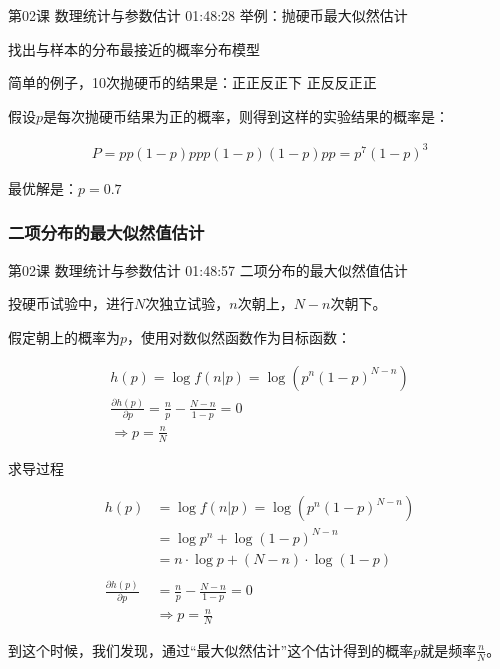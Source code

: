 \documentclass[UTF8]{ctexbook}
\begin{document}
第02课 数理统计与参数估计 01:48:28 举例：抛硬币最大似然估计

找出与样本的分布最接近的概率分布模型

简单的例子，10次抛硬币的结果是：正正反正下 正反反正正

假设$p$是每次抛硬币结果为正的概率，则得到这样的实验结果的概率是：

\begin{equation}
\begin{aligned}
P=pp(1-p)ppp(1-p)(1-p)pp=p^{7}(1-p)^{3}
\end{aligned}
\end{equation}

最优解是：$p=0.7$

\subsubsection{二项分布的最大似然值估计}

第02课 数理统计与参数估计 01:48:57 二项分布的最大似然值估计

投硬币试验中，进行$N$次独立试验，$n$次朝上，$N-n$次朝下。

假定朝上的概率为$p$，使用对数似然函数作为目标函数：

\begin{equation}
\begin{aligned}
h(p)=\log f(n|p)=\log (p^{n}(1-p)^{N-n}) \\
\frac{\partial h(p)}{\partial p}=\frac{n}{p} - \frac{N-n}{1-p} = 0 \\
\Rightarrow p = \frac{n}{N}
\end{aligned}
\end{equation}

求导过程

\begin{equation}
\begin{aligned}
h(p)&=\log f(n|p)=\log (p^{n}(1-p)^{N-n}) \\
&=\log p^{n} + \log (1-p)^{N-n} \\
&= n \cdot \log p + (N-n) \cdot \log (1-p) \\ \\
\frac{\partial h(p)}{\partial p}&=\frac{n}{p} - \frac{N-n}{1-p} = 0 \\
& \Rightarrow p = \frac{n}{N}
\end{aligned}
\end{equation}

到这个时候，我们发现，通过“最大似然估计”这个估计得到的概率$p$就是频率$\frac{n}{N}$。
\end{document}
